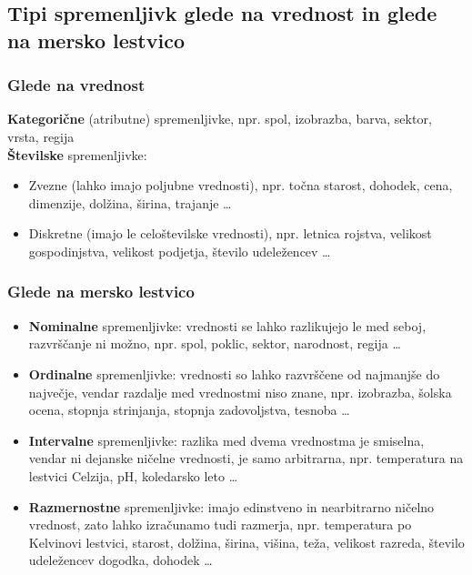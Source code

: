 \subsection{Tipi spremenljivk glede na vrednost in glede na mersko lestvico}

\subsubsection*{Glede na vrednost}

\textbf{Kategorične} (atributne) spremenljivke, npr. spol, izobrazba, barva, sektor, vrsta, regija\\
\textbf{Številske} spremenljivke:
\begin{itemize}
\item Zvezne (lahko imajo poljubne vrednosti), npr. točna starost, dohodek, cena, dimenzije, dolžina, širina, trajanje …
\item Diskretne (imajo le celoštevilske vrednosti), npr. letnica rojstva, velikost gospodinjstva, velikost podjetja, število udeležencev …
\end{itemize}

\subsubsection*{Glede na mersko lestvico}
\begin{itemize}
\item \textbf{Nominalne} spremenljivke: vrednosti se lahko razlikujejo le med seboj, razvrščanje ni možno, npr. spol, poklic, sektor, narodnost, regija …
\item \textbf{Ordinalne} spremenljivke: vrednosti so lahko razvrščene od najmanjše do največje, vendar razdalje med vrednostmi niso znane, npr. izobrazba, šolska ocena, stopnja strinjanja, stopnja zadovoljstva, tesnoba …
\item \textbf{Intervalne} spremenljivke: razlika med dvema vrednostma je smiselna, vendar ni dejanske ničelne vrednosti, je samo arbitrarna, npr. temperatura na lestvici Celzija, pH, koledarsko leto …
\item \textbf{Razmernostne} spremenljivke: imajo edinstveno in nearbitrarno ničelno vrednost, zato lahko izračunamo tudi razmerja, npr. temperatura po Kelvinovi lestvici, starost, dolžina, širina, višina, teža, velikost razreda, število udeležencev dogodka, dohodek …
\end{itemize}

